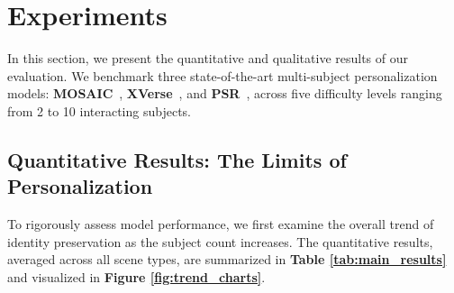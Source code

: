\section{Experiments}

In this section, we present the quantitative and qualitative results of our evaluation. We benchmark three state-of-the-art multi-subject personalization models: \textbf{MOSAIC}~\cite{mosaic2024}, \textbf{XVerse}~\cite{xverse2024}, and \textbf{PSR}~\cite{psr2024}, across five difficulty levels ranging from 2 to 10 interacting subjects.

\subsection{Quantitative Results: The Limits of Personalization}

To rigorously assess model performance, we first examine the overall trend of identity preservation as the subject count increases. The quantitative results, averaged across all scene types, are summarized in \textbf{Table \ref{tab:main_results}} and visualized in \textbf{Figure \ref{fig:trend_charts}}.

 
\begin{table}[t]
\centering
\caption{\textbf{Quantitative Evaluation on Multi-Subject Personalization Benchmark.} We report CLIP-T, CLIP-I, DINOv2, and Subject Collapse Rate (SCR@0.4) across varying subject counts (2 to 10). As subject count increases, DINOv2 sharply declines and SCR approaches 100\%, indicating catastrophic identity failure.}
\label{tab:main_results}
\end{table}


